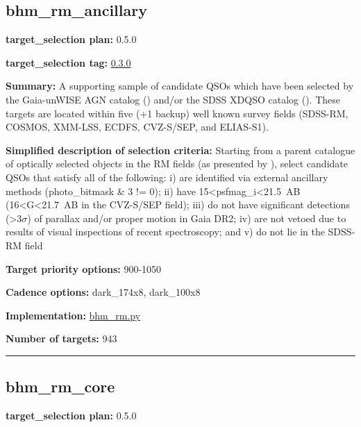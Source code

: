 \hypertarget{bhm_rm_ancillary_plan0.5.0}{%
\subsection{bhm\_rm\_ancillary}\label{bhm_rm_ancillary_plan0.5.0}}

\noindent\textbf{target\_selection plan:} 0.5.0

\noindent\textbf{target\_selection tag:}
\href{https://github.com/sdss/target_selection/tree/0.3.0/}{0.3.0}

\noindent\textbf{Summary:} A supporting sample of candidate QSOs which have been
selected by the Gaia-unWISE AGN catalog
(\citealt{Shu2019}) and/or the SDSS XDQSO catalog
(\citealt{Bovy2011}). These targets are located within five (+1 backup) well
known survey fields (SDSS-RM, COSMOS, XMM-LSS, ECDFS, CVZ-S/SEP, and
ELIAS-S1).

\noindent\textbf{Simplified description of selection criteria:} Starting from a
parent catalogue of optically selected objects in the RM fields (as
presented by
\citealt{Yang2022}), select candidate QSOs that satisfy all of the
following: i) are identified via external ancillary methods
(photo\_bitmask \& 3 != 0); ii) have
15\textless{}psfmag\_i\textless{}21.5~AB
(16\textless{}G\textless{}21.7~AB in the CVZ-S/SEP field); iii) do not
have significant detections (\textgreater{}3$\sigma$) of parallax and/or proper
motion in Gaia DR2; iv) are not vetoed due to results of visual
inspections of recent spectroscopy; and v) do not lie in the SDSS-RM
field


\noindent\textbf{Target priority options:} 900-1050

\noindent\textbf{Cadence options:} dark\_174x8, dark\_100x8

\noindent\textbf{Implementation:}
\href{https://github.com/sdss/target_selection/blob/0.3.0/python/target_selection/cartons/bhm_rm.py}{bhm\_rm.py}

\noindent\textbf{Number of targets:} 943

\begin{center}\rule{0.5\linewidth}{0.5pt}\end{center}

\hypertarget{bhm_rm_core_plan0.5.0}{%
\subsection{bhm\_rm\_core}\label{bhm_rm_core_plan0.5.0}}

\noindent\textbf{target\_selection plan:} 0.5.0

